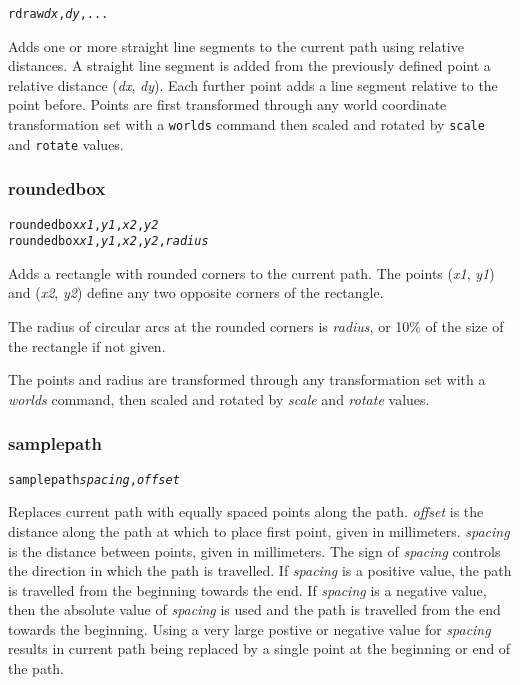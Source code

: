 \begin{alltt}
rdraw \textit{dx}, \textit{dy}, ...
\end{alltt}

Adds one or more straight line segments to the current path
using relative distances.
A straight line segment is added from the previously defined point
a relative distance (\textit{dx}, \textit{dy}).  Each further
point adds a line segment relative to the point before.
Points are first transformed through any world coordinate
transformation set with a \texttt{worlds} command
then scaled and rotated by \texttt{scale}
and \texttt{rotate} values.

\subsubsection{roundedbox}

\begin{alltt}
roundedbox \textit{x1}, \textit{y1}, \textit{x2}, \textit{y2}
roundedbox \textit{x1}, \textit{y1}, \textit{x2}, \textit{y2}, \textit{radius}
\end{alltt}

Adds a rectangle with rounded corners to the current path.
The points
(\textit{x1}, \textit{y1}) and (\textit{x2}, \textit{y2}) define
any two opposite corners of the rectangle.

The radius of circular arcs at the rounded corners is 
\textit{radius}, or 10\% of the size of the rectangle if not given.

The points and radius are transformed through any
transformation set with a \textit{worlds} command,
then scaled and rotated by \textit{scale}
and \textit{rotate} values.

\subsubsection{samplepath}

\begin{alltt}
samplepath \textit{spacing}, \textit{offset}
\end{alltt}

Replaces current path with equally spaced points along the path.
\textit{offset} is the distance along the path at which to place first point,
given in millimeters.  \textit{spacing} is the distance between points, given
in millimeters.  The sign of \textit{spacing} controls the direction in which
the path is travelled.  If \textit{spacing} is a positive value, the path is
travelled from the beginning towards the end.  If \textit{spacing} is a
negative value, then the absolute value of \textit{spacing} is used and the
path is travelled from the end towards the beginning.  Using a very large
postive or negative value for \textit{spacing} results in current path being
replaced by a single point at the beginning or end of the path.

